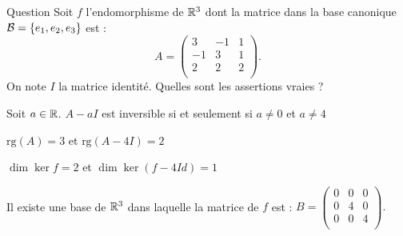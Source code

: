 \begin{multi}[multiple,feedback=
{On vérifie que \(A-aI\) est inversible si et seulement si \(a\neq 0\) et \(a\neq 4\), que 
\(\mbox{rg} (A)=2\) et \(\mbox{rg} (A-4I)=1\).  
Une base de \(\ker f\) est \(\{u_1\}\), où \(u_1=(1,1,-2)\), et donc \(\dim \ker f = 1 \).
Une base de \(\ker (f-4I)\) est \(\{u_2,u_3\}\), où \(u_2=(1,-1,0)\) et \(u_3=(1,0,1)\) donc \(\dim \ker (f-4I) = 2 \).
\vskip0mm
La matrice de \(f\) dans la base \(\{u_1,u_2,u_3\}\) est : 
\(B= \left(\begin{array}{rcc}
0&0&0\\
0&4&0\\ 
0&0&4\\
\end{array}\right).\)
}]{Question}
Soit \(f\) l'endomorphisme de \(\mathbb{R}^3\) dont la matrice dans la base canonique \({\cal B}=\{e_1,e_2,e_3\}\) est : 
\[A = \left(\begin{array}{rcc}
3&-1&1\\
-1&3&1\\ 
2&2&2\\
\end{array}\right).\] On note \(I\) la matrice identité. 
Quelles sont les assertions vraies ?

    \item* Soit \(a\in \mathbb{R}\). \(A-aI\) est inversible si et seulement si \(a\neq 0\) et \(a\neq 4\)
    \item \(\mbox{rg} (A)=3\) et \(\mbox{rg} (A-4I)=2\)
    \item \(\dim \ker f = 2 \) et \(\dim \ker (f-4Id) = 1 \)
    \item* Il existe une base de \(\mathbb{R}^3\) dans laquelle la matrice de \(f\) est :
\(B= \left(\begin{array}{rcc}
0&0&0\\
0&4&0\\
0&0&4\\
\end{array}\right).\)
\end{multi}


